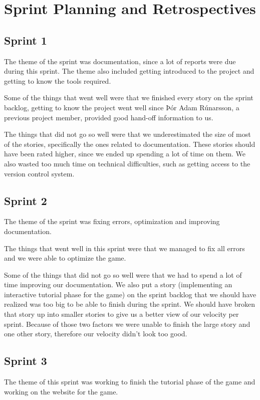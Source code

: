 \section{Sprint Planning and Retrospectives}\label{sec:retrospectives}

\subsection{Sprint 1}
The theme of the sprint was documentation, since a lot of reports were due during this sprint. The theme also included getting introduced to the project and getting to know the tools required.


Some of the things that went well were that we finished every story on the sprint backlog, getting to know the project went well since Þór Adam Rúnarsson, a previous project member, provided good hand-off information to us.


The things that did not go so well were that we underestimated the size of most of the stories, specifically the ones related to documentation. These stories should have been rated higher, since we ended up spending a lot of time on them. We also wasted too much time on technical difficulties, such as getting access to the version control system. 

\subsection{Sprint 2}
The theme of the sprint was fixing errors, optimization and improving documentation.

The things that went well in this sprint were that we managed to fix all errors and we were able to optimize the game. 

Some of the things that did not go so well were that we had to spend a lot of time improving our documentation. We also put a story (implementing an interactive tutorial phase for the game) on the sprint backlog that we should have realized was too big to be able to finish during the sprint. We should have broken that story up into smaller stories to give us a better view of our velocity per sprint. Because of those two factors we were unable to finish the large story and one other story, therefore our velocity didn't look too good.

\subsection{Sprint 3}
The theme of this sprint was working to finish the tutorial phase of the game and working on the website for the game. 

